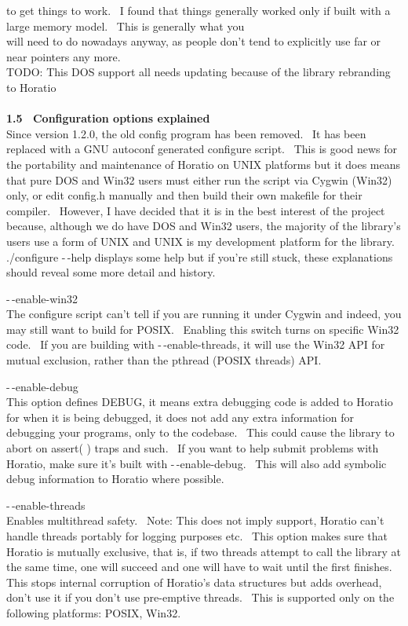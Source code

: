 \documentclass{article}
\begin{document}
to get things to work.~ I found that things generally worked only
if built with a large memory model.~ This is generally what you\\
will need to do nowadays anyway, as people don't tend to explicitly use
far or near pointers any more.\\
TODO: This DOS support all needs updating because of the library rebranding to Horatio\\
\\
\textbf{1.5~ Configuration options explained}
\\
Since version 1.2.0, the old config program has been removed.~ It
has been replaced with a GNU autoconf generated configure script.~
This is good news for the portability and maintenance of Horatio on
UNIX platforms but it does means that pure DOS and Win32 users must
either run the script via Cygwin (Win32) only, or edit config.h
manually and then build their own makefile for their compiler.~
However, I have decided that it is in the best interest of the project
because, although we do have DOS and Win32 users, the majority of the
library's users use a form of UNIX and UNIX is my development platform
for the library.\\
./configure -$\,$-help displays some help but if you're still stuck, these
explanations
should reveal some more detail and history.
\par -$\,$-enable-win32\\
The configure script can't tell if you are running it under Cygwin and
indeed, you may still want to build for POSIX.~ Enabling this
switch turns on specific Win32 code.~ If you are building with
-$\,$-enable-threads, it will use the Win32 API for mutual exclusion,
rather than the pthread (POSIX threads) API.\\

\par -$\,$-enable-debug
\\
This option defines DEBUG, it means extra debugging code is added to
Horatio for when it is being debugged, it does not add any extra
information
for debugging your programs, only to the codebase.~ This could cause
the
library to abort on assert( ) traps and such.~ If you want to help
submit problems with Horatio, make sure it's built with
-$\,$-enable-debug.~
This will also add symbolic debug information to Horatio where
possible.\\

\par -$\,$-enable-threads
\\
Enables multithread safety.~ Note: This does not imply support,
Horatio can't handle threads portably for logging purposes etc.~
This option makes sure that Horatio is mutually exclusive, that is, if
two threads attempt to call the library at the same time, one will
succeed
and one will have to wait until the first finishes.~ This stops
internal
corruption of Horatio's data structures but adds overhead, don't use
it
if you don't use pre-emptive threads.~ This is supported only on
the
following platforms: POSIX, Win32.\\
\end{document}
